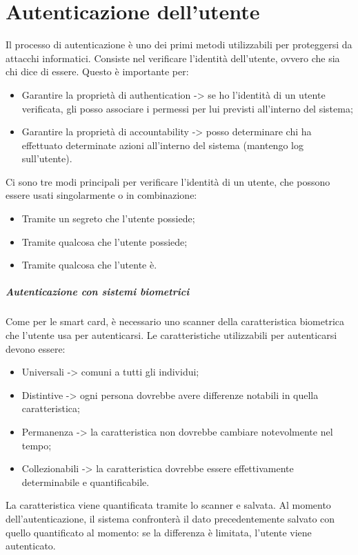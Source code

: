 \chapter{Autenticazione dell'utente}
Il processo di autenticazione è uno dei primi metodi utilizzabili per proteggersi da attacchi informatici. Consiste nel verificare l'identità dell'utente, ovvero che sia chi dice di essere. 
Questo è importante per:
\begin{itemize}
    \item Garantire la proprietà di authentication -> se ho l'identità di un utente verificata, gli posso associare i permessi per lui previsti all'interno del sistema;
    \item Garantire la proprietà di accountability -> posso determinare chi ha effettuato determinate azioni all'interno del sistema (mantengo log sull'utente).
\end{itemize}

Ci sono tre modi principali per verificare l'identità di un utente, che possono essere usati singolarmente o in combinazione:
\begin{itemize}
    \item Tramite un segreto che l'utente possiede;
    \item Tramite qualcosa che l'utente possiede;
    \item Tramite qualcosa che l'utente è.
\end{itemize}

\paragraph{Autenticazione con sistemi biometrici} Come per le smart card, è necessario uno scanner della caratteristica biometrica che l'utente usa per autenticarsi. 
Le caratteristiche utilizzabili per autenticarsi devono essere:
\begin{itemize}
    \item Universali -> comuni a tutti gli individui;
    \item Distintive -> ogni persona dovrebbe avere differenze notabili in quella caratteristica;
    \item Permanenza -> la caratteristica non dovrebbe cambiare notevolmente nel tempo;
    \item Collezionabili -> la caratteristica dovrebbe essere effettivamente determinabile e quantificabile.
\end{itemize}

\noindent La caratteristica viene quantificata tramite lo scanner e salvata. Al momento dell'autenticazione, il sistema confronterà il dato precedentemente salvato con quello quantificato al momento: se la differenza è limitata, l'utente viene autenticato.


